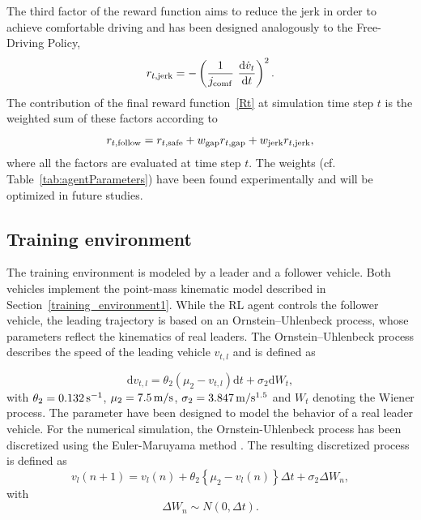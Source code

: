 \documentclass[review]{elsarticle}
\providecommand{\sub}[1]{_{\mathrm{#1}}}  %
\providecommand{\3}{{\ss}}
\begin{document}
	
	
	The third factor of the reward function aims to reduce the jerk in
	order to achieve comfortable driving and has been designed analogously to the Free-Driving Policy, 
	\begin{equation}
	\label{eq:r3_CFP}
	r_{t, \rm jerk} = -\left(\frac{1}{j\sub{comf}} \ \dv{\dot{v}_t}{t}\right)^2.
	\end{equation}
	The contribution of the final reward function~\eqref{Rt}  at simulation time step $t$ is the weighted
	sum of these factors according to
	\begin{equation}
	\label{rt2}
	r_{t, \rm follow} = r_{t, \rm safe} + w\sub{gap}r_{t,\rm gap}+w\sub{jerk}r_{t, \rm jerk} ,
	\end{equation}
	where all the factors are evaluated at time step $t$. The weights (cf.
	Table~\ref{tab:agentParameters}) have been found experimentally and
	will be optimized in future studies.
	
	
	
	
	\subsection{Training environment}
	\label{training_environment2}
	The training environment is modeled by a leader and a follower vehicle. Both vehicles implement the point-mass kinematic model described in Section~\ref{training_environment1}. While the RL agent controls the follower vehicle, the leading trajectory is based on an Ornstein–Uhlenbeck process, whose parameters
	reflect the kinematics of real leaders. The Ornstein–Uhlenbeck process describes
	the speed of the leading vehicle $v_{t,l}$ and is defined as 
	
	\begin{equation} \label{eq:AR1}
    \mathrm{d} v_{t,l}=\theta_2\left(\mu_2-v_{t,l}\right) \mathrm{d} t+\sigma_2 \mathrm{d} W_{t},
	\end{equation}
	with $\theta_2 = \unit[0.132]{s^{-1}}$, $\mu_2 = \unit[7.5]{m/s}$, $\sigma_2 = \unit[3.847]{m/s^{1.5}}$ and $W_{t}$ denoting the Wiener process. The parameter have been designed to model the behavior of a real leader vehicle.
	For the numerical simulation, the Ornstein-Uhlenbeck process has been discretized using the Euler-Maruyama method \citep{CIRprocess}. The resulting discretized process is defined as
	\begin{equation} 
	v_{l}(n+1)=v_{l}(n)+\theta_2\left\{\mu_2-v_{l}(n)\right\} \Delta t+\sigma_2 \Delta W_{n},
	\end{equation}
	with 
	\begin{equation}
	\Delta W_{n} \sim N(0, \Delta t).
	\end{equation}
	
\end{document}
